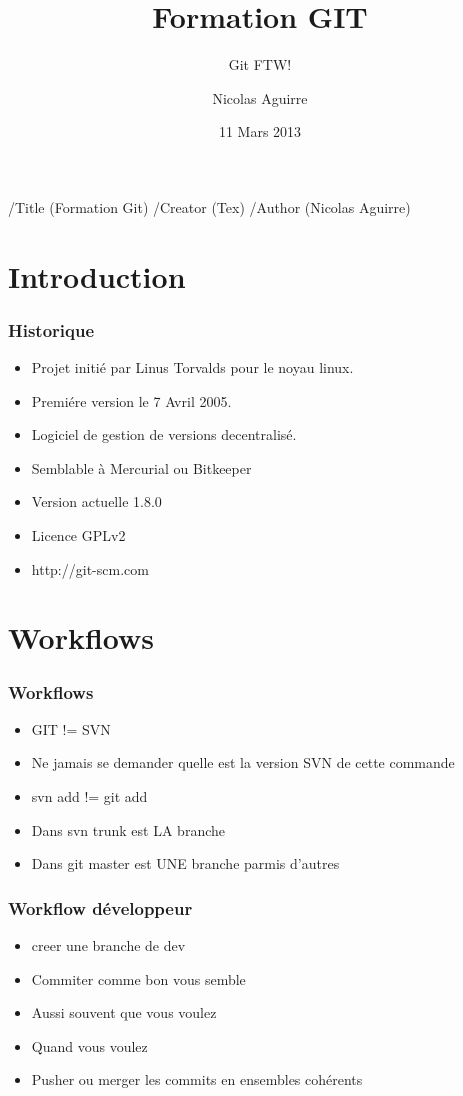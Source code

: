 \documentclass{beamer}
\begin{document}
\pdfinfo
    {
      /Title       (Formation Git)
      /Creator     (Tex)
      /Author      (Nicolas Aguirre)
    }


    \title{Formation GIT}
    \subtitle{Git FTW!}
    \author{Nicolas Aguirre}
    \date{11 Mars 2013}

    \frame{\titlepage}

    \section{Introduction}
    \begin{frame}
      \frametitle{Historique}
      \begin{itemize}
      \item Projet initié par Linus Torvalds pour le noyau linux.
      \item Premiére version le 7 Avril 2005.
      \item Logiciel de gestion de versions decentralisé.
      \item Semblable à Mercurial ou Bitkeeper
      \item Version actuelle 1.8.0
      \item Licence GPLv2
      \item http://git-scm.com
      \end{itemize}
    \end{frame}
    \section{Workflows}
    \begin{frame}
      \frametitle{Workflows}
      \begin{itemize}
        \item GIT != SVN
        \item Ne jamais se demander quelle est la version SVN de cette commande
        \item svn add != git add
        \item Dans svn trunk est LA branche
        \item Dans git master est UNE branche parmis d'autres
      \end{itemize}
    \end{frame}
    
    \begin{frame}
      \frametitle{Workflow développeur}
      \begin{itemize}
        \item creer une branche de dev
        \item Commiter comme bon vous semble
        \item Aussi souvent que vous voulez
        \item Quand vous voulez
        \item Pusher ou merger les commits en ensembles cohérents
      \end{itemize}
    \end{frame}
\end{document}
